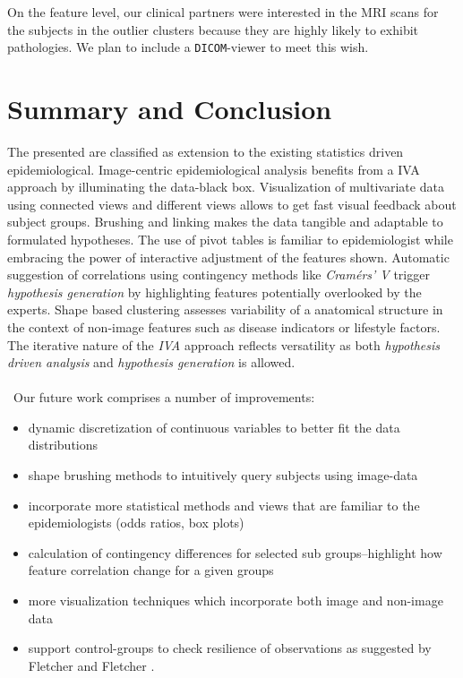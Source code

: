 \documentclass[journal]{style/vgtc} 			          %
\begin{document}
On the feature level, our clinical partners were interested in the MRI scans for the subjects in the outlier clusters because they are highly likely to exhibit pathologies.
%
We plan to include a \texttt{DICOM}-viewer to meet this wish.


\section{Summary and Conclusion}
The presented are classified as extension to the existing statistics driven epidemiological.
%
Image-centric epidemiological analysis benefits from a IVA approach by illuminating the data-black box.
%
Visualization of multivariate data using connected views and different views allows to get fast visual feedback about subject groups.
%
Brushing and linking makes the data tangible and adaptable to formulated hypotheses.
%
The use of pivot tables is familiar to epidemiologist while embracing the power of interactive adjustment of the features shown.
%
Automatic suggestion of correlations using contingency methods like \emph{Cram\'{e}rs' V} trigger \emph{hypothesis generation} by highlighting features potentially overlooked by the experts.
%
Shape based clustering assesses variability of a anatomical structure in the context of non-image features such as disease indicators or lifestyle factors.
%
The iterative nature of the \emph{IVA} approach reflects versatility as both \emph{hypothesis driven analysis} and \emph{hypothesis generation} is allowed.
\\\\\
Our future work comprises a number of improvements:
\begin{itemize}
	\item dynamic discretization of continuous variables to better fit the data distributions
	\item shape brushing methods to intuitively query subjects using image-data
	\item incorporate more statistical methods and views that are familiar to the epidemiologists (odds ratios, box plots)
	\item calculation of contingency differences for selected sub groups--highlight how feature correlation change for a given groups
	\item more visualization techniques which incorporate both image and non-image data
	\item support control-groups to check resilience of observations as suggested by Fletcher and Fletcher \cite{Fletcher2012}.
\end{itemize}
\end{document}
